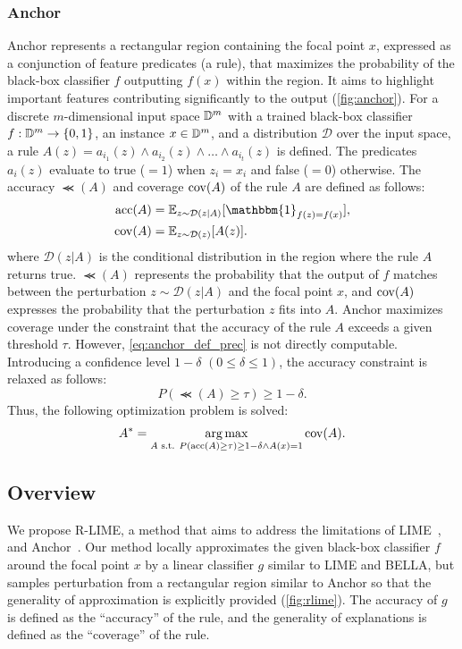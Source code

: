 \documentclass[11pt]{article}
\begin{document}
\subsubsection[Anchor]{%
	Anchor~\cite{ribeiro2018anchors}
}\label{sec:anchor}
Anchor represents a rectangular region containing the focal point $x$,
expressed as a conjunction of feature predicates (a rule),
that maximizes the probability of the black-box classifier $f$
outputting $f(x)$ within the region.
It aims to highlight important features
contributing significantly to the output (\cref{fig:anchor}).
For a discrete $m$-dimensional input space $\mathbb{D}^{m}$
with a trained black-box classifier $f: \mathbb{D}^{m} \to \{0,1\}$,
an instance $x \in \mathbb{D}^{m}$,
and a distribution $\mathcal{D}$ over the input space,
a rule $A(z) = a_{i_1}(z) \wedge a_{i_2}(z) \wedge \dots \wedge a_{i_t}(z)$ is defined.
The predicates $a_i(z)$ evaluate to true ($=1$) when $z_i = x_i$ and false ($=0$) otherwise.
The accuracy $\Prec(A)$ and coverage $\operatorname{cov}(A)$ of the rule $A$ are defined as follows:
\begin{align}
	\Prec(A) & =\mathbb{E}_{z\sim\mathcal{D}(z|A)}
	[\mathbbm{1}_{f(z)=f(x)}], \label{eq:anchor_def_prec} \\
	\Cov(A)  & =\mathbb{E}_{z\sim\mathcal{D}(z)}[A(z)].
\end{align}
where $\mathcal{D}(z|A)$ is the conditional distribution in the region
where the rule $A$ returns true.
$\Prec(A)$ represents the probability that the output of $f$ matches
between the perturbation $z\sim\mathcal{D}(z|A)$ and the focal point $x$,
and $\operatorname{cov}(A)$ expresses the probability that the perturbation $z$ fits into $A$.
Anchor maximizes coverage under the constraint that
the accuracy of the rule $A$ exceeds a given threshold $\tau$.
However, \cref{eq:anchor_def_prec} is not directly computable.
Introducing a confidence level $1-\delta$ $(0\le\delta\le1)$,
the accuracy constraint is relaxed as follows:
\begin{equation}
	\label{eq:const_prec}
	P(\Prec(A)\ge\tau)\ge1-\delta.
\end{equation}
Thus, the following optimization problem is solved:
\begin{equation}
	\label{eq:main_problem}
	A^*=\underset{A \text{~s.t. } P(\operatorname{acc}(A)\ge\tau)\ge1-\delta\wedge A(x)=1}
	{\arg\max}\operatorname{cov}(A).
\end{equation}

\subsection{Overview}
We propose R-LIME,
a method that aims to address the limitations of LIME~\cite{ribeiro2016why},
and Anchor~\cite{ribeiro2018anchors}.
Our method locally approximates the given black-box classifier $f$
around the focal point $x$ by a linear classifier $g$ similar to LIME and BELLA,
but samples perturbation from a rectangular region similar to Anchor
so that the generality of approximation is explicitly provided
(\cref{fig:rlime}).
The accuracy of $g$ is defined as the ``accuracy'' of the rule,
and the generality of explanations is defined as the ``coverage'' of the rule.
\end{document}
